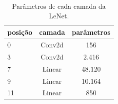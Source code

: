 \begin{table}[!t]
\centering
\caption{Parâmetros de cada camada da LeNet.}
\label{tab:lenet}
\begin{tabular}{lcc}
\hline
posição & camada & parâmetros \\
\hline
0 & Conv2d & 156 \\
3 & Conv2d & 2.416 \\
7 & Linear & 48.120 \\
9 & Linear & 10.164 \\
11 & Linear & 850 \\
\hline
\end{tabular}
\end{table}